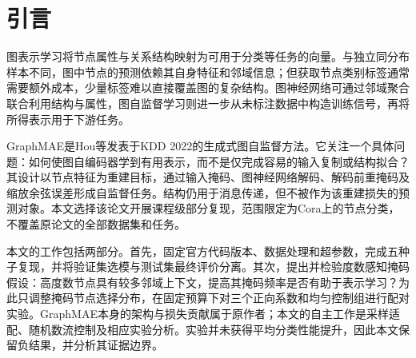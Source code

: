 \section{引言}\label{sec:introduction}
图表示学习将节点属性与关系结构映射为可用于分类等任务的向量。与独立同分布样本不同，图中节点的预测依赖其自身特征和邻域信息；但获取节点类别标签通常需要额外成本，少量标签难以直接覆盖图的复杂结构。图神经网络可通过邻域聚合联合利用结构与属性，图自监督学习则进一步从未标注数据中构造训练信号，再将所得表示用于下游任务。

GraphMAE是Hou等发表于KDD 2022的生成式图自监督方法\cite{hou2022graphmae}。它关注一个具体问题：如何使图自编码器学到有用表示，而不是仅完成容易的输入复制或结构拟合？其设计以节点特征为重建目标，通过输入掩码、图神经网络解码、解码前重掩码及缩放余弦误差形成自监督任务。结构仍用于消息传递，但不被作为该重建损失的预测对象。本文选择该论文开展课程级部分复现，范围限定为Cora上的节点分类，不覆盖原论文的全部数据集和任务。

本文的工作包括两部分。首先，固定官方代码版本、数据处理和超参数，完成五种子复现，并将验证集选模与测试集最终评价分离。其次，提出并检验度数感知掩码假设：高度数节点具有较多邻域上下文，提高其掩码频率是否有助于表示学习？为此只调整掩码节点选择分布，在固定预算下对三个正向系数和均匀控制组进行配对实验。GraphMAE本身的架构与损失贡献属于原作者；本文的自主工作是采样适配、随机数流控制及相应实验分析。实验并未获得平均分类性能提升，因此本文保留负结果，并分析其证据边界。
